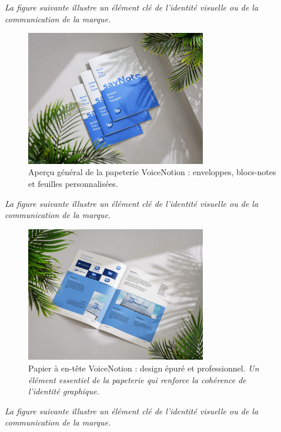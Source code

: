\noindent
\textit{La figure suivante illustre un élément clé de l'identité visuelle ou de la communication de la marque.}
\begin{figure}[H]
    \centering
    \includegraphics[width=0.7\textwidth]{docs/visual-indentity/pictures/pappiers.jpg}
    \caption{Aperçu général de la papeterie VoiceNotion : enveloppes, blocs-notes et feuilles personnalisées.}
\end{figure}
\noindent
\textit{La figure suivante illustre un élément clé de l'identité visuelle ou de la communication de la marque.}
\begin{figure}[H]
    \centering
    \includegraphics[width=0.7\textwidth]{docs/visual-indentity/pictures/pappier.jpg}
    \caption{Papier à en-tête VoiceNotion : design épuré et professionnel. \newline\textit{Un élément essentiel de la papeterie qui renforce la cohérence de l'identité graphique.}}
\end{figure}
\noindent
\textit{La figure suivante illustre un élément clé de l'identité visuelle ou de la communication de la marque.}
